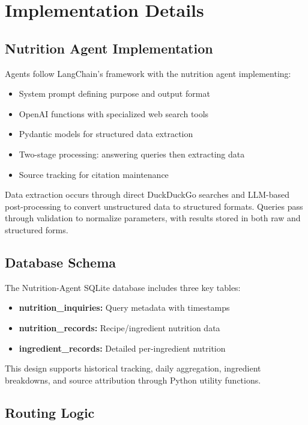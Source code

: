 \documentclass{ecai}
\begin{document}
\section{Implementation Details}

\subsection{Nutrition Agent Implementation}

Agents follow LangChain's framework with the nutrition agent implementing:
\begin{itemize}[noitemsep,topsep=0pt]
    \item System prompt defining purpose and output format
    \item OpenAI functions with specialized web search tools
    \item Pydantic models for structured data extraction
    \item Two-stage processing: answering queries then extracting data
    \item Source tracking for citation maintenance
\end{itemize}

Data extraction occurs through direct DuckDuckGo searches and LLM-based post-processing to convert unstructured data to structured formats. Queries pass through validation to normalize parameters, with results stored in both raw and structured forms.

\subsection{Database Schema}

The Nutrition-Agent SQLite database includes three key tables:
\begin{itemize}[noitemsep,topsep=0pt]
    \item \textbf{nutrition\_inquiries:} Query metadata with timestamps
    \item \textbf{nutrition\_records:} Recipe/ingredient nutrition data
    \item \textbf{ingredient\_records:} Detailed per-ingredient nutrition
\end{itemize}

This design supports historical tracking, daily aggregation, ingredient breakdowns, and source attribution through Python utility functions.

\subsection{Routing Logic}
\end{document}
